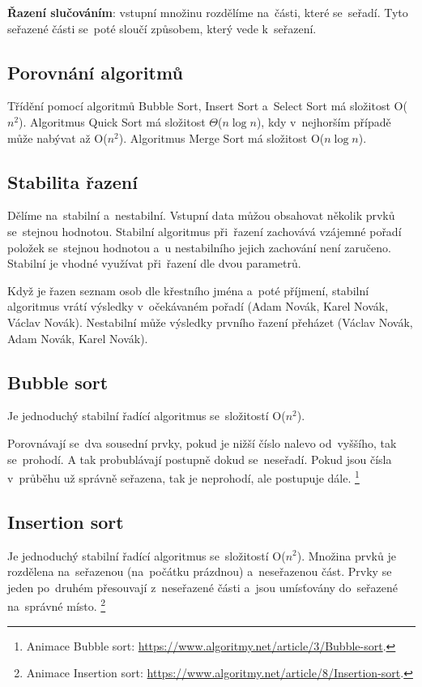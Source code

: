 \textbf{Řazení slučováním}: vstupní množinu rozdělíme na~části, které se~seřadí. Tyto seřazené části se~poté sloučí způsobem, který vede k~seřazení.

\subsection{Porovnání algoritmů}

Třídění pomocí algoritmů Bubble Sort, Insert Sort a~Select Sort má složitost O(\( n^2 \)). Algoritmus Quick Sort má složitost \( \Theta \)(\( n\log{n} \)), kdy v~nejhorším případě může nabývat až O(\( n^2 \)). Algoritmus Merge Sort má složitost O(\( n\log{n} \)).

\subsection{Stabilita řazení}

Dělíme na~stabilní a~nestabilní. Vstupní data můžou obsahovat několik prvků se~stejnou hodnotou. Stabilní algoritmus při~řazení zachovává vzájemné pořadí položek se~stejnou hodnotou a~u nestabilního jejich zachování není zaručeno. Stabilní je vhodné využívat při~řazení dle dvou parametrů.

Když je řazen seznam osob dle křestního jména a~poté příjmení, stabilní algoritmus vrátí výsledky v~očekávaném pořadí (Adam Novák, Karel Novák, Václav Novák). Nestabilní může výsledky prvního řazení přeházet (Václav Novák, Adam Novák, Karel Novák).

\subsection{Bubble sort}

Je jednoduchý stabilní řadící algoritmus se~složitostí O(\( n^2 \)).

Porovnávají se~dva sousední prvky, pokud je nižší číslo nalevo od~vyššího, tak se~prohodí. A tak probublávají postupně dokud se~neseřadí. Pokud jsou čísla v~průběhu už správně seřazena, tak je neprohodí, ale postupuje dále.%
\footnote{Animace Bubble sort: \url{https://www.algoritmy.net/article/3/Bubble-sort}.}

\subsection{Insertion sort}

Je jednoduchý stabilní řadící algoritmus se~složitostí O(\( n^2 \)). Množina prvků je rozdělena na~seřazenou (na~počátku prázdnou) a~neseřazenou část. Prvky se jeden po~druhém přesouvají z~neseřazené části a~jsou umísťovány do~seřazené na~správné místo.%
\footnote{Animace Insertion sort: \url{https://www.algoritmy.net/article/8/Insertion-sort}.}

